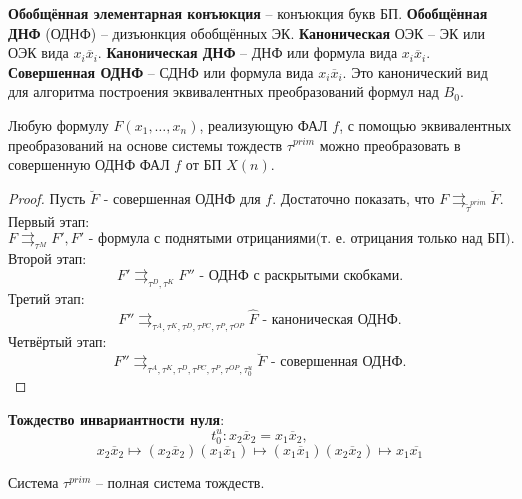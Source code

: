 \documentclass[11pt]{article}
\newcounter{th}\setcounter{th}{0}
\newcounter{stnmt}\setcounter{stnmt}{0}
\def\st{\par\smallskip\refstepcounter{stnmt}\textbf{\arabic{stnmt}}}
\newtheorem*{Statement}{Утверждение \st}
\begin{document}
\textbf{Обобщённая элементарная конъюкция} -- конъюкция букв БП. \textbf{Обобщённая ДНФ} (ОДНФ) -- дизъюнкция
обобщённых ЭК. \textbf{Каноническая} ОЭК -- ЭК или ОЭК вида \(x_i\overline{x}_i\). \textbf{Каноническая ДНФ} --
ДНФ или формула вида \(x_i\overline{x}_i\). \textbf{Совершенная ОДНФ} -- СДНФ или формула вида \(x_i\overline{x}_i\).
Это канонический вид для алгоритма построения эквивалентных преобразований формул над \(B_0\).
\begin{Statement}
Любую формулу $F(x_1, \ldots, x_n)$, реализующую ФАЛ $f$, с помощью эквивалентных преобразований
на основе системы тождеств $\tau^{prim}$ можно преобразовать в совершенную ОДНФ ФАЛ $f$ от БП $X(n)$.
\end{Statement}
\begin{proof}
Пусть $\breve{F}$ - совершенная ОДНФ для $f$. Достаточно показать, что
$F \rightrightarrows_{\tilde{\tau}^{prim}}\breve{F}$.
Первый этап:
\begin{equation}
F \rightrightarrows_{\tau^M}F', F'\text{ - формула с поднятыми отрицаниями(т. е. отрицания только над БП).}
\end{equation}
Второй этап:
\begin{equation}
F' \rightrightarrows_{\tau^D, \tau^K} F''\text{ - ОДНФ с раскрытыми скобками.}
\end{equation}
Третий этап:
\begin{equation}
F'' \rightrightarrows_{\tau^A, \tau^K, \tau^D, \tau^{PC}, \tau^P, \tau^{OP}} \hat{F}\text{ - каноническая ОДНФ.}
\end{equation}
Четвёртый этап:
\begin{equation}
F'' \rightrightarrows_{\tau^A, \tau^K, \tau^D, \tau^{PC}, \tau^P, \tau^{OP}, \tau^u_0} \breve{F}\text{ - совершенная ОДНФ.}
\end{equation}
\end{proof}
\textbf{Тождество инвариантности нуля}:
\begin{equation}
t^u_0: x_2\overline{x}_2 = x_1\overline{x}_2,
\end{equation}
\begin{equation}
x_2\overline{x}_2 \mapsto (x_2\overline{x}_2)(x_1\overline{x}_1) \mapsto (x_1\overline{x}_1)
(x_2\overline{x}_2) \mapsto x_1\overline{x_1}
\end{equation}
\begin{Statement}
Система $\tau^{prim}$ -- полная система тождеств.
\end{Statement}
\end{document}

